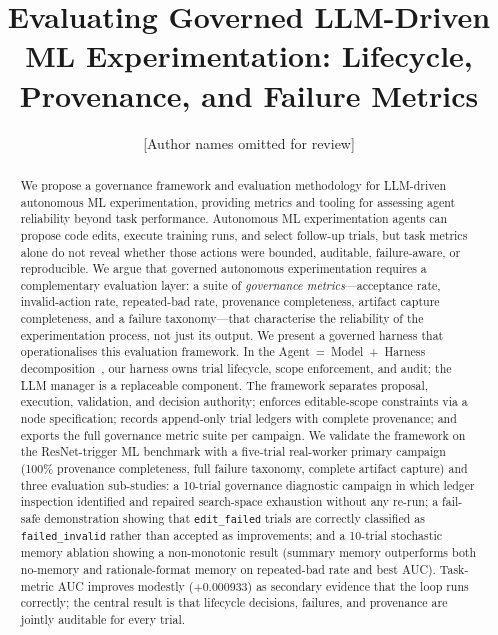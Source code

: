 \documentclass[sigconf]{acmart}
\begin{document}
\title{Evaluating Governed LLM-Driven ML Experimentation: Lifecycle, Provenance, and Failure Metrics}

\author{[Author names omitted for review]}
\email{[omitted]}

\begin{abstract}
We propose a governance framework and evaluation methodology for LLM-driven
autonomous ML experimentation, providing metrics and tooling for assessing
agent reliability beyond task performance.
Autonomous ML experimentation agents can propose code edits, execute
training runs, and select follow-up trials, but task metrics alone do not
reveal whether those actions were bounded, auditable, failure-aware, or
reproducible.
We argue that governed autonomous experimentation requires a complementary
evaluation layer: a suite of \emph{governance metrics}---acceptance rate,
invalid-action rate, repeated-bad rate, provenance completeness, artifact
capture completeness, and a failure taxonomy---that characterise the
reliability of the experimentation process, not just its output.
We present a governed harness that operationalises this evaluation framework.
In the Agent~=~Model~+~Harness decomposition~\cite{trivedy2026anatomy},
our harness owns trial lifecycle, scope enforcement, and audit; the LLM
manager is a replaceable component.
The framework separates proposal, execution, validation, and decision
authority; enforces editable-scope constraints via a node specification;
records append-only trial ledgers with complete provenance; and exports the
full governance metric suite per campaign.
We validate the framework on the ResNet-trigger ML benchmark with a
five-trial real-worker primary campaign (100\% provenance completeness,
full failure taxonomy, complete artifact capture) and three evaluation
sub-studies: a 10-trial governance diagnostic campaign in which ledger
inspection identified and repaired search-space exhaustion without any
re-run; a fail-safe demonstration showing that \texttt{edit\_failed} trials
are correctly classified as \texttt{failed\_invalid} rather than accepted as
improvements; and a 10-trial stochastic memory ablation showing a
non-monotonic result (summary memory outperforms both no-memory and
rationale-format memory on repeated-bad rate and best AUC).
Task-metric AUC improves modestly (+0.000933) as secondary evidence that
the loop runs correctly; the central result is that lifecycle decisions,
failures, and provenance are jointly auditable for every trial.
\end{abstract}
\end{document}
